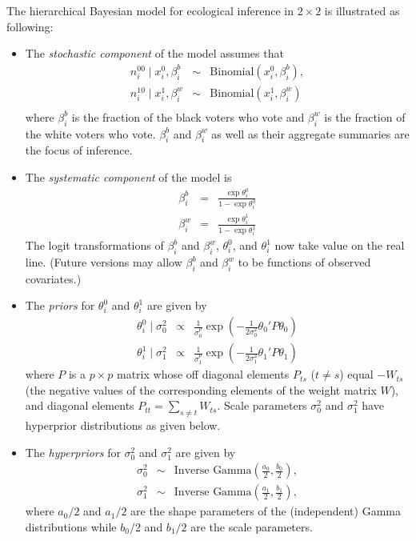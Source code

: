 The hierarchical Bayesian model for ecological inference in 
$2 \times 2$ is illustrated as following: 
\begin{itemize}
\item The \emph{stochastic component} of the model assumes that
\begin{eqnarray*}
n_{i}^{00}\mid x_i^0,\beta_i^b &\sim& \textrm{Binomial}\left(
x_i^0, \beta_i^b\right)  ,\\
n_{i}^{10} \mid x_i^1, \beta_i^w &\sim& \textrm{Binomial}\left(
x_i^1, \beta_i^w\right)  \\
\end{eqnarray*}
where $\beta_{i}^{b}$ is the fraction of the black voters who vote
and $\beta_i^w$ is the fraction of the white voters who vote. $\beta_i^b$ 
and $\beta_i^w$ as well as their aggregate summaries are the focus
of inference.

\item The \emph{systematic component} of the model is 
\begin{eqnarray*}
\beta_i^b &=& \frac{\exp\theta_i^0}{1 - \exp\theta_i^0} \\
\beta_i^w &=& \frac{\exp\theta_i^1}{1 - \exp\theta_i^1} 
\end{eqnarray*}
The logit transformations of $\beta^b_i$ and $\beta^w_i$, $\theta_{i}^0$, 
and $\theta_i^1$ now take value on the real line. (Future versions may allow
$\beta_{i}^{b}$ and $\beta_{i}^{w}$ to be functions of observed covariates.)

\item The \emph{priors} for $\theta_{i}^0$ and $\theta_{i}^1$
 are given by
\begin{eqnarray*}
\theta_{i}^{0}   \mid\sigma_{0}^{2}&\propto & \frac{1}{\sigma_0^{p}} \exp
\left( -\frac{1}{2\sigma_{0}^2}\theta_0' P \theta_0 \right) \\
\theta_{i}^{1}   \mid\sigma_{1}^{2}&\propto & \frac{1}{\sigma_1^{p}} \exp
\left( -\frac{1}{2\sigma_{1}^2}\theta_1' P \theta_1 \right) 
\end{eqnarray*}
where $P$ is a $p \times p$ matrix whose off diagonal elements
$P_{ts}$ ($t \ne s$) equal $-W_{ts}$ (the negative values of the corresponding
elements of the weight matrix $W$), and diagonal elements 
$P_{tt}=\sum_{s\ne t} W_{ts}$. Scale parameters $\sigma_{0}^2$ and
$\sigma_{1}^2$ have hyperprior distributions as given below.  

\item The \emph{hyperpriors} for $\sigma_{0}^{2}$ and $\sigma_{1}^{2}$ are
given by
\begin{eqnarray*}
\sigma_{0}^{2}  & \sim& \textrm{Inverse Gamma}\left(\frac{a_{0}}{2},\frac{b_{0}}{2}\right)  ,\\
\sigma_{1}^{2}  & \sim& \textrm{Inverse Gamma}\left(\frac{a_{1}}{2},\frac{b_{1}}{2}\right)  ,
\end{eqnarray*}
where $a_{0}/2$ and $a_{1}/2$ are the shape parameters of the 
(independent) Gamma distributions while $b_{0}/2$ and $b_{1}/2$
 are the scale parameters. \\


\end{itemize}
